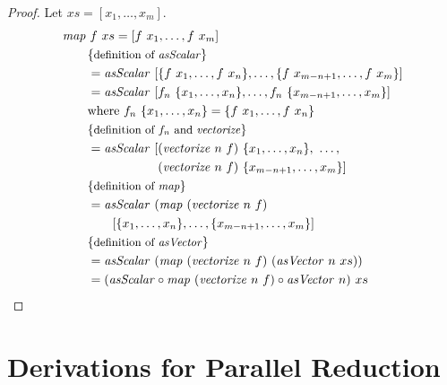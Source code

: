 \begin{proof}[Proof]
  Let $xs = [x_1, \ldots, x_m]$.
  \begin{align*}
    &\map\ f\ xs = [f\ x_1, \ldots, f\ x_m]\\
    &\qquad \comment{definition of \asScalar}\\
    &\qquad = \asScalar\ [\{f\ x_1, \ldots, f\ x_n\}, \ldots ,\{f\ x_{m-n+1}, \ldots, f\ x_m\}]\\
    &\qquad = \asScalar\ [f_n\ \{x_1, \ldots, x_n\}, \ldots ,f_n\ \{x_{m-n+1}, \ldots, x_m\}]\\
    &\qquad \text{where } f_n\ \{x_1, \ldots, x_n\} = \{f\ x_1, \ldots, f\ x_n\}\\
    &\qquad \comment{definition of $f_n$ and \vect}\\
    &\qquad = \asScalar\
      \begin{aligned}[t]
        [&(\vect\ n\ f)\ \{x_1, \ldots, x_n\},\ \ldots ,\\
         &(\vect\ n\ f)\ \{x_{m-n+1}, \ldots, x_m\}]
      \end{aligned}\\
    &\qquad \comment{definition of \map}\\
    &\qquad = \asScalar\ (\map\ (\vect\ n\ f)\\
    &\qquad\qquad [\{x_1, \ldots, x_n\}, \ldots ,\{x_{m-n+1}, \ldots, x_m\}]\\
    &\qquad \comment{definition of \asVector}\\
    &\qquad = \asScalar\ (\map\ (\vect\ n\ f)\ (\asVector\ n\ xs))\\
    &\qquad = (\asScalar \circ \map\ (\vect\ n\ f) \circ \asVector\ n)\ xs
  \end{align*}
\end{proof}















\chapter{Derivations for Parallel Reduction}
\label{chapter:derivations}

